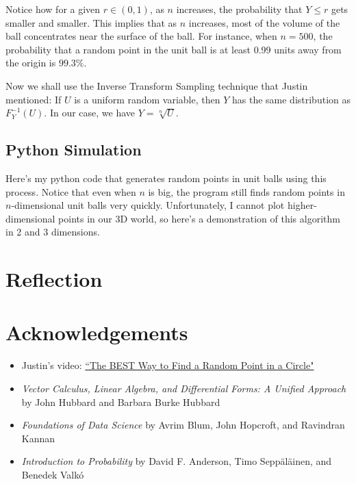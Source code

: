 \documentclass{article}
\begin{document}
Notice how for a given $r \in (0, 1)$, as $n$ increases, the probability that $Y \leq r$ gets smaller and smaller. This implies that as $n$ increases, most of the volume of the ball concentrates near the surface of the ball. For instance, when $n = 500$, the probability that a random point in the unit ball is at least 0.99 units away from the origin is $99.3\%$.

Now we shall use the Inverse Transform Sampling technique that Justin mentioned: If $U$ is a uniform random variable, then $Y$ has the same distribution as $F_Y^{-1}(U)$. In our case, we have $Y = \sqrt[n]{U}$.

\subsection{Python Simulation}

Here's my python code that generates random points in unit balls using this process. Notice that even when $n$ is big, the program still finds random points in $n$-dimensional unit balls very quickly. Unfortunately, I cannot plot higher-dimensional points in our 3D world, so here's a demonstration of this algorithm in 2 and 3 dimensions.


\section{Reflection}

\section{Acknowledgements}

\begin{itemize}
  \item Justin's video: \href{https://www.youtube.com/watch?v=4y_nmpv-9lI&list=PLnQX-jgAF5pTkwtUuVpqS5tuWmJ-6ZM-Z&index=6&t=3s}{``The BEST Way to Find a Random Point in a Circle"}
  \item \textit{Vector Calculus, Linear Algebra, and Differential Forms: A Unified Approach} by John Hubbard and Barbara Burke Hubbard
  \item \textit{Foundations of Data Science} by Avrim Blum, John Hopcroft, and Ravindran Kannan
  \item \textit{Introduction to Probability} by David F. Anderson, Timo Sepp\"{a}l\"{a}inen, and Benedek Valk\'{o}
\end{itemize}
\end{document}
